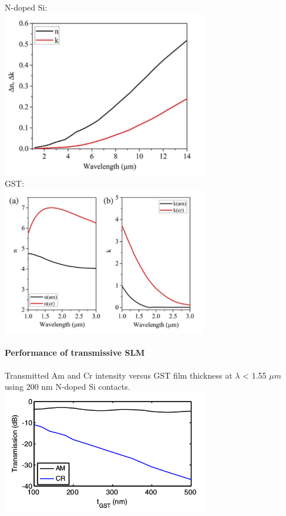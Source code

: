 \documentclass[]{article}
\let\oldparagraph\paragraph
\renewcommand{\paragraph}[1]{\oldparagraph{#1}\mbox{}}
\begin{document}
N-doped Si:\\
\includegraphics[width = 9cm]{image/002_06.png}\\
GST:\\
\includegraphics[width = 9cm]{image/002_07.png}

\paragraph{Performance of transmissive
SLM}\label{performance-of-transmissive-slm}

Transmitted Am and Cr intensity versus GST film thickness at $\lambda$ < 1.55 $\mu m$
using 200 nm N-doped Si contacts.\\
\includegraphics[width = 9cm]{image/002_08.png}
\end{document}
